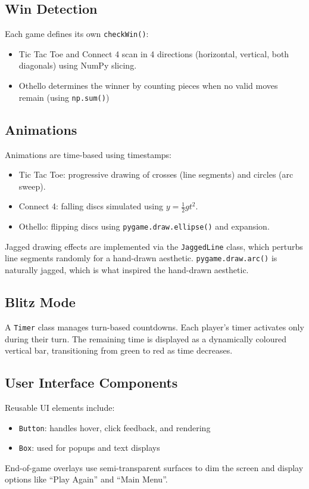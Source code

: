 \documentclass[12pt]{article}
\begin{document}
\subsection{Win Detection}
Each game defines its own \texttt{checkWin()}:
\begin{itemize}
    \item Tic Tac Toe and Connect 4 scan in 4 directions (horizontal, vertical, both diagonals) using NumPy slicing.
    \item Othello determines the winner by counting pieces when no valid moves remain (using \texttt{np.sum()})
\end{itemize}

\subsection{Animations}
Animations are time-based using timestamps:
\begin{itemize}
    \item Tic Tac Toe: progressive drawing of crosses (line segments) and circles (arc sweep).
    \item Connect 4: falling discs simulated using $y = \frac{1}{2}gt^2$.
    \item Othello: flipping discs using \texttt{pygame.draw.ellipse()} and expansion.
\end{itemize}

Jagged drawing effects are implemented via the \texttt{JaggedLine} class, which perturbs line segments randomly for a hand-drawn aesthetic.
\texttt{pygame.draw.arc()} is naturally jagged, which is what inspired the hand-drawn aesthetic.

\subsection{Blitz Mode}
A \texttt{Timer} class manages turn-based countdowns. Each player’s timer activates only during their turn. The remaining time is displayed as a dynamically coloured vertical bar, transitioning from green to red as time decreases.

\subsection{User Interface Components}
Reusable UI elements include:
\begin{itemize}
    \item \texttt{Button}: handles hover, click feedback, and rendering
    \item \texttt{Box}: used for popups and text displays
\end{itemize}
End-of-game overlays use semi-transparent surfaces to dim the screen and display options like ``Play Again'' and ``Main Menu''.
\end{document}
